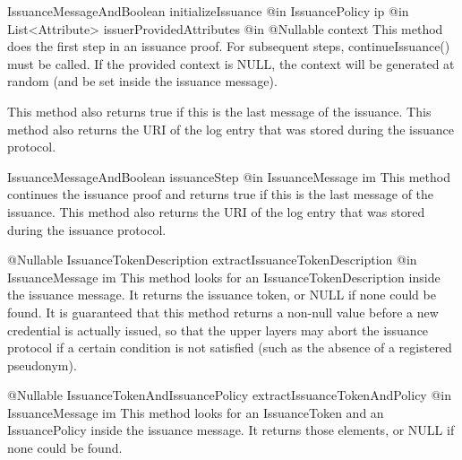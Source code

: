       \begin{method}
      {IssuanceMessageAndBoolean}
      {initializeIssuance}
      {
        {@in IssuancePolicy ip}
        {@in List<Attribute> issuerProvidedAttributes}
        {@in @Nullable context}
      }
      This method does the first step in an issuance proof. For subsequent steps, continueIssuance() must be called.
      If the provided context is NULL, the context will be generated at random (and be set inside the issuance message).

      This method also returns true if this is the last message of the issuance.
      This method also returns the URI of the log entry that was stored during the issuance protocol.
      \end{method}
      
      \begin{method}
      {IssuanceMessageAndBoolean}
      {issuanceStep}
      {
        {@in IssuanceMessage im}
      }
      This method continues the issuance proof and returns true if this is
      the last message of the issuance.
      This method also returns the URI of the log entry that was stored during the issuance protocol.
      \end{method}
      
      \begin{method}
      {@Nullable IssuanceTokenDescription}
      {extractIssuanceTokenDescription}
      {
        {@in IssuanceMessage im}
      }
      This method looks for an IssuanceTokenDescription inside the issuance message. It returns the issuance token, or
      NULL if none could be found.
      It is guaranteed that this method returns a non-null value before a new credential is actually issued, so that the
      upper layers may abort the issuance protocol if a certain condition is not satisfied (such as the absence of a registered pseudonym).
      \end{method}
      
      \begin{method}
      {@Nullable IssuanceTokenAndIssuancePolicy}
      {extractIssuanceTokenAndPolicy}
      {
        {@in IssuanceMessage im}
      }
      This method looks for an IssuanceToken and an IssuancePolicy inside the issuance message. It returns those elements, or
      NULL if none could be found.
      \end{method}

